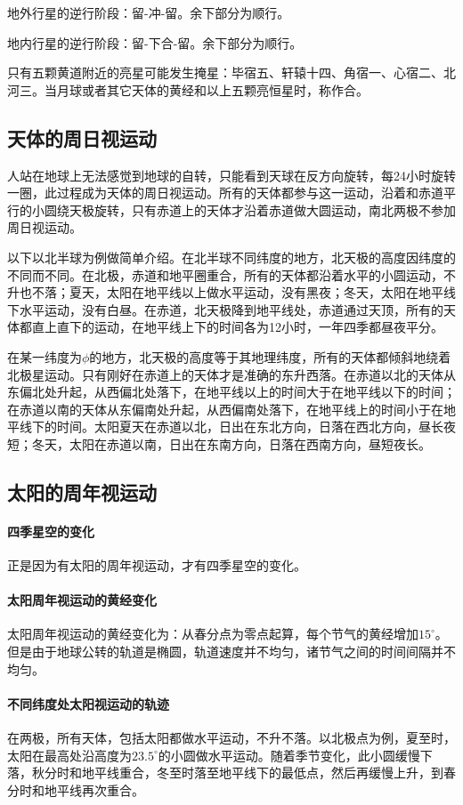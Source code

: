 地外行星的逆行阶段：留-冲-留。余下部分为顺行。

地内行星的逆行阶段：留-下合-留。余下部分为顺行。

只有五颗黄道附近的亮星可能发生掩星：毕宿五、轩辕十四、角宿一、心宿二、北河三。当月球或者其它天体的黄经和以上五颗亮恒星时，称作合。
\subsection{天体的周日视运动}人站在地球上无法感觉到地球的自转，只能看到天球在反方向旋转，每24小时旋转一圈，此过程成为天体的周日视运动。所有的天体都参与这一运动，沿着和赤道平行的小圆绕天极旋转，只有赤道上的天体才沿着赤道做大圆运动，南北两极不参加周日视运动。

以下以北半球为例做简单介绍。在北半球不同纬度的地方，北天极的高度因纬度的不同而不同。在北极，赤道和地平圈重合，所有的天体都沿着水平的小圆运动，不升也不落；夏天，太阳在地平线以上做水平运动，没有黑夜；冬天，太阳在地平线下水平运动，没有白昼。在赤道，北天极降到地平线处，赤道通过天顶，所有的天体都直上直下的运动，在地平线上下的时间各为12小时，一年四季都昼夜平分。

在某一纬度为$\phi$的地方，北天极的高度等于其地理纬度，所有的天体都倾斜地绕着北极星运动。只有刚好在赤道上的天体才是准确的东升西落。在赤道以北的天体从东偏北处升起，从西偏北处落下，在地平线以上的时间大于在地平线以下的时间；在赤道以南的天体从东偏南处升起，从西偏南处落下，在地平线上的时间小于在地平线下的时间。太阳夏天在赤道以北，日出在东北方向，日落在西北方向，昼长夜短；冬天，太阳在赤道以南，日出在东南方向，日落在西南方向，昼短夜长。
\subsection{太阳的周年视运动}
\paragraph{四季星空的变化}正是因为有太阳的周年视运动，才有四季星空的变化。
\paragraph{太阳周年视运动的黄经变化}太阳周年视运动的黄经变化为：从春分点为零点起算，每个节气的黄经增加$15^\circ$。但是由于地球公转的轨道是椭圆，轨道速度并不均匀，诸节气之间的时间间隔并不均匀。
\paragraph{不同纬度处太阳视运动的轨迹}在两极，所有天体，包括太阳都做水平运动，不升不落。以北极点为例，夏至时，太阳在最高处沿高度为$23.5^\circ$的小圆做水平运动。随着季节变化，此小圆缓慢下落，秋分时和地平线重合，冬至时落至地平线下的最低点，然后再缓慢上升，到春分时和地平线再次重合。

